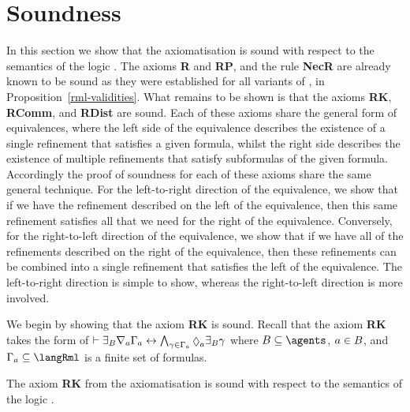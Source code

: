 \section{Soundness}\label{rml-k-soundness}

In this section we show that the axiomatisation \axiomRmlK{} is sound with respect to the semantics of the logic \logicRmlK{}.
The axioms {\bf R} and {\bf RP}, and the rule {\bf NecR} are already known to be sound as they were established for all variants of \logicRml{}, in Proposition~\ref{rml-validities}.
What remains to be shown is that the axioms {\bf RK}, {\bf RComm}, and {\bf RDist} are sound.
Each of these axioms share the general form of equivalences, where the left side of the equivalence describes the existence of a single refinement that satisfies a given formula, whilst the right side describes the existence of multiple refinements that satisfy subformulas of the given formula.
Accordingly the proof of soundness for each of these axioms share the same general technique.
For the left-to-right direction of the equivalence, we show that if we have the refinement described on the left of the equivalence, then this same refinement satisfies all that we need for the right of the equivalence.
Conversely, for the right-to-left direction of the equivalence, we show that if we have all of the refinements described on the right of the equivalence, then these refinements can be combined into a single refinement that satisfies the left of the equivalence.
The left-to-right direction is simple to show, whereas the right-to-left direction is more involved.

We begin by showing that the axiom {\bf RK} is sound.
Recall that the axiom {\bf RK} takes the form of $\proves \somerefsBs \coversA \Gamma_\agentA \iff \bigwedge_{\gamma \in \Gamma_\agentA} \possibleA \somerefsBs \gamma$ where $\agentsB \subseteq \agents$, $a \in B$, and $\Gamma_\agentA \subseteq \langRml$ is a finite set of formulas.

\begin{lemma}\label{rml-k-rk}
The axiom {\bf RK} from the axiomatisation \axiomRmlK{} is sound with respect to the semantics of the logic \logicRmlK{}.
\end{lemma}

